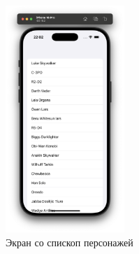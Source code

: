 \documentclass[14pt, russian]{scrartcl}
\begin{document}
\begin{figure}[H]
    \centering
    \includegraphics[width=0.4\textwidth]{ios_list.png}
    \caption{Экран со спископ персонажей}
    \label{fig:list_screen}
\end{figure}
\end{document}
